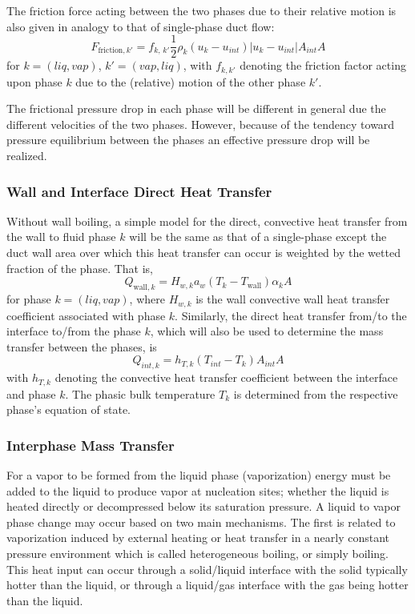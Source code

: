 \begin{itemize}
The friction force acting between the two phases due to their relative
motion is also given in analogy to that of single-phase duct flow:
\begin{equation}
  F_{\text{friction}, k'} = f_{k, \, k'} \frac{1}{2} \rho_k (u_k - u_{int}) \left| u_k -u_{int} \right|  A_{int}  A
\end{equation}
for $k=(liq, vap)$, $k'=(vap, liq)$, with $f_{k, k'}$ denoting the friction factor acting upon phase $k$
due to the (relative) motion of the other phase $k'$. 

The frictional pressure drop in each phase will be different in 
general due the different velocities of the two phases.  However, 
because of the tendency toward pressure equilibrium between the phases 
an effective pressure drop will be realized.


\subsubsection{Wall and Interface Direct Heat Transfer}
Without wall boiling, a simple model for the direct, convective heat transfer
from the wall to fluid phase $k$ will be the same as that of a single-phase
except the duct wall area over which this heat transfer can occur is weighted
by the wetted fraction of the phase.  That is,
\begin{equation}
  Q_{ \text{wall}, k } = H_{w,k} a_w \left(T_k  - T_{ \text{wall} } \right) \alpha_k A
\end{equation}
for phase $k=(liq, vap)$, where $H_{w,k}$ is the wall convective wall heat transfer
coefficient associated with phase $k$.  Similarly, the direct heat
transfer from/to the interface to/from the phase $k$, which will also
be used to determine the mass transfer between the phases, is
\begin{equation}
  Q_{int,  k} = h_{T,  k}  \left( T_{int} - T_k \right)  A_{int}  A
\end{equation}
with $h_{T,  k}$ denoting the convective heat transfer coefficient
between the interface and phase $k$. The phasic bulk
temperature $T_k$ is determined from the respective phase's equation of
state.


\subsubsection{Interphase Mass Transfer}
For a vapor to be formed from the liquid phase (vaporization) energy
must be added to the liquid to produce vapor at nucleation sites;
whether the liquid is heated directly or decompressed below its
saturation pressure.  A liquid to vapor phase change may occur based
on two main mechanisms.  The first is related to vaporization induced
by external heating or heat transfer in a nearly constant pressure
environment which is called heterogeneous boiling, or simply
boiling.  This heat input can occur through a solid/liquid
interface with the solid typically hotter than the liquid, or through
a liquid/gas interface with the gas being hotter than the liquid.


\end{itemize}
